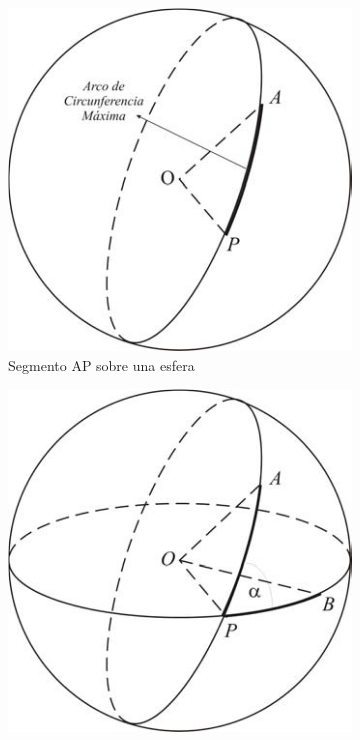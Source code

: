 \begin{figure}[ht]
	\centering
	
	\begin{subfigure}[t]{0.3\textwidth}
		\includegraphics[width=\textwidth]{segmento_ap1} 
		\caption{Segmento AP sobre una esfera}	
		\label{fig:segAP}
	\end{subfigure}
	\hfill
	\begin{subfigure}[t]{0.3\textwidth}
		\includegraphics[width=\textwidth]{segmento_ap2} 

\end{subfigure}
\end{figure}
